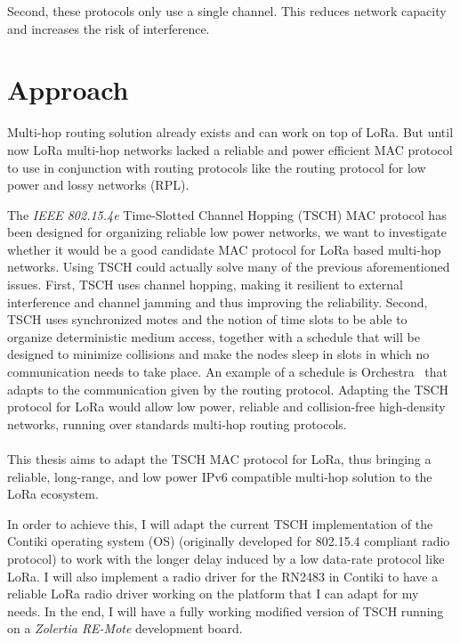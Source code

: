 Second, these protocols only use a single channel.
This reduces network capacity and increases the risk of
interference.

\section{Approach}

Multi-hop routing solution already exists and can work on top of LoRa.
But until now LoRa multi-hop networks lacked a reliable and power efficient MAC protocol
to use in conjunction with routing protocols like the routing protocol for low power
and lossy networks (RPL).

The \emph{IEEE 802.15.4e} Time-Slotted Channel Hopping (TSCH) MAC protocol
has been designed for organizing reliable low power networks, we want to
investigate whether it would be a good candidate MAC protocol for LoRa based
multi-hop networks.
Using TSCH could actually solve many of the previous aforementioned issues.
First, TSCH uses channel hopping, making it resilient to external interference and
channel jamming and thus improving the reliability.
Second, TSCH uses synchronized motes and the notion of time slots to be able to organize
deterministic medium access, together with a schedule that will be designed to
minimize collisions and make the nodes sleep in slots in which no communication
needs to take place.
An example of a schedule is Orchestra~\cite{duquennoy2015} that adapts to the
communication given by the routing protocol.
Adapting the TSCH protocol for LoRa would allow low power,
reliable and collision-free high-density networks, running over standards
multi-hop routing protocols.

\paragraph{}

This thesis aims to adapt the TSCH MAC protocol for LoRa,
thus bringing a reliable, long-range, and low power IPv6 compatible multi-hop
solution to the LoRa ecosystem.

In order to achieve this, I will adapt the current TSCH implementation of
the Contiki operating system (OS) (originally developed for 802.15.4 compliant radio protocol)
to work with the longer delay induced by a low data-rate protocol like LoRa.
I will also implement a radio driver for the RN2483 in Contiki to have a
reliable LoRa radio driver working on the platform that I can adapt for my
needs.
In the end, I will have a fully working modified version of TSCH running on a
\emph{Zolertia RE-Mote} development board.

